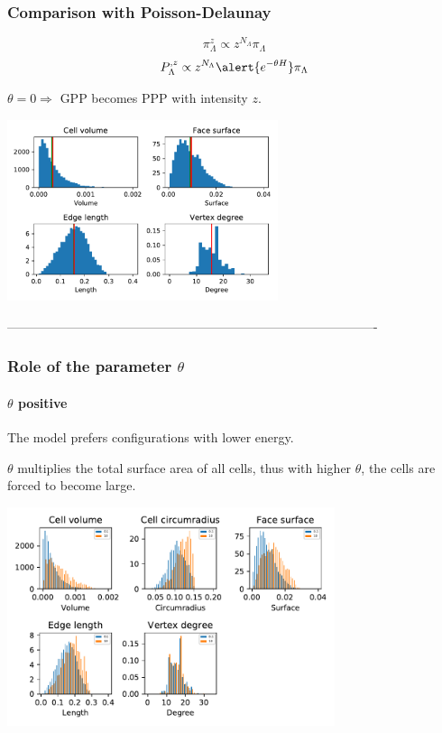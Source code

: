 \documentclass[c, 10pt]{beamer}
\begin{document}
 
\begin{frame}\frametitle{Comparison with Poisson-Delaunay}
$$ \pi_\Lambda^z \propto z^{N_\Lambda} \pi_\Lambda$$
\vspace{-4mm}
$$ P^{, z}_\Lambda \propto z^{N_\Lambda} \alert{ e^{-\theta H}} \pi_\Lambda $$
\begin{small}$\theta = 0 \Rightarrow$ GPP becomes PPP with intensity $z$.\end{small}
\begin{center}
\includegraphics[height = 5.3cm]{./FigureLayout/facets_Poisson.pdf}
\end{center}
\end{frame}




----------------------------------------------------------------------------------------
\begin{frame}\frametitle{Role of the parameter $\theta$}\framesubtitle{$\theta$ positive}

\begin{small}
The model prefers configurations with lower energy.

$\theta$ multiplies the total surface area of all cells, thus with higher $\theta$, the cells are forced to become large. 
\end{small}
\begin{center}
\includegraphics[height = 6.4cm]{./FigureLayout/facets_extr.pdf}
\end{center}

\end{frame}
\end{document}
